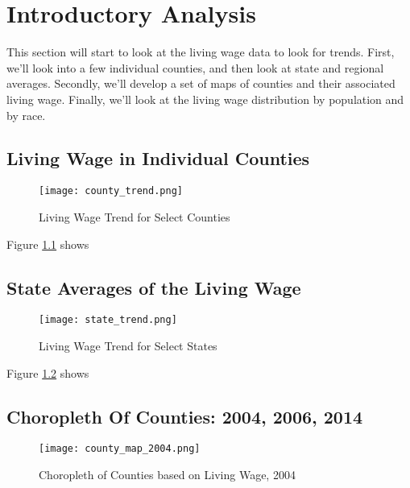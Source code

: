 \chapter{Introductory Analysis}\label{ch:intro_analysis}

This section will start to look at the living wage data to look for trends. First, we'll look into a few individual counties, and then look at state and regional averages. Secondly, we'll develop a set of maps of counties and their associated living wage. Finally, we'll look at the living wage distribution by population and by race.

\section{Living Wage in Individual Counties}

\begin{figure}[hbt]
    \centering
        \texttt{[image: county\_trend.png]}
        \caption{Living Wage Trend for Select Counties}
    \label{f:ch4_individual}
\end{figure}

Figure \ref{f:ch4_individual} shows



\section{State Averages of the Living Wage}


\begin{figure}[hbt]
    \centering
        \texttt{[image: state\_trend.png]}
        \caption{Living Wage Trend for Select States}
    \label{f:ch4_state_trend}
\end{figure}

Figure \ref{f:ch4_state_trend} shows


\section{Choropleth Of Counties: 2004, 2006, 2014}

\begin{figure}[hbt]
    \centering
        \texttt{[image: county\_map\_2004.png]}
        \caption{Choropleth of Counties based on Living Wage, 2004}
    \label{f:ch4_county_map_2004}
\end{figure}

